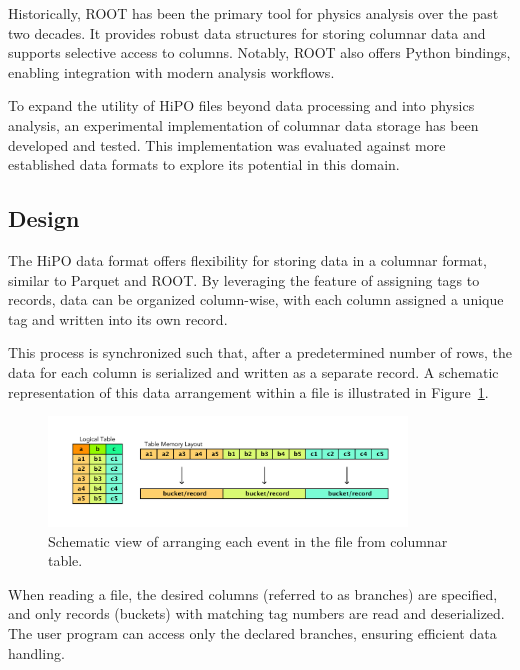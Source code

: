 \documentclass[preprint,12pt]{elsarticle}
\begin{document}
Historically, ROOT has been the primary tool for physics analysis over the past two decades. It provides robust data structures for storing columnar data and supports selective access to columns. Notably, ROOT also offers Python bindings, enabling integration with modern analysis workflows.

To expand the utility of HiPO files beyond data processing and into physics analysis, an experimental implementation of columnar data storage has been developed and tested. This implementation was evaluated against more established data formats to explore its potential in this domain.

\subsection{Design}

The HiPO data format offers flexibility for storing data in a columnar format, similar to Parquet and ROOT. By leveraging the feature of assigning tags to records, data can be organized column-wise, with each column assigned a unique tag and written into its own record. 

This process is synchronized such that, after a predetermined number of rows, the data for each column is serialized and written as a separate record. A schematic representation of this data arrangement within a file is illustrated in Figure~\ref{fig:tuple_schema}.

\begin{figure}[h!]
  \begin{center}
    \includegraphics[width=0.85\textwidth]{images/tuple_schema.pdf}
 \end{center}
  \caption{Schematic view of arranging each event in the file from columnar table.}
 \label{fig:tuple_schema}
\end{figure}

When reading a file, the desired columns (referred to as branches) are specified, and only records (buckets) with matching tag numbers are read and deserialized. The user program can access only the declared branches, ensuring efficient data handling. 
\end{document}
